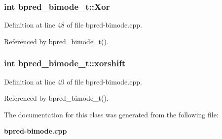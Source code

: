 \subsubsection[{Xor}]{\setlength{\rightskip}{0pt plus 5cm}int {\bf bpred\_\-bimode\_\-t::Xor}\hspace{0.3cm}{\tt  [protected]}}\label{classbpred__bimode__t_7238343e64e82043a9ade3d28281ab96}




Definition at line 48 of file bpred-bimode.cpp.

Referenced by bpred\_\-bimode\_\-t().
\subsubsection[{xorshift}]{\setlength{\rightskip}{0pt plus 5cm}int {\bf bpred\_\-bimode\_\-t::xorshift}\hspace{0.3cm}{\tt  [protected]}}\label{classbpred__bimode__t_d44477f1eebe30335ba38766093ac97d}




Definition at line 49 of file bpred-bimode.cpp.

Referenced by bpred\_\-bimode\_\-t().

The documentation for this class was generated from the following file:\begin{CompactItemize}
\item 
{\bf bpred-bimode.cpp}\end{CompactItemize}
